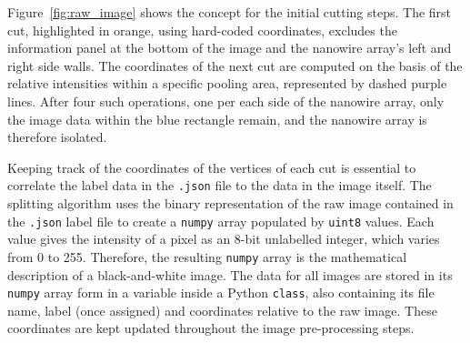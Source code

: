 Figure~\ref{fig:raw_image} shows the concept for the initial cutting steps. The first cut, highlighted in orange, using hard-coded coordinates, excludes the information panel at the bottom of the image and the nanowire array's left and right side walls. The coordinates of the next cut are computed on the basis of the relative intensities within a specific pooling area, represented by dashed purple lines. After four such operations, one per each side of the nanowire array, only the image data within the blue rectangle remain, and the nanowire array is therefore isolated.

Keeping track of the coordinates of the vertices of each cut is essential to correlate the label data in the \texttt{.json} file to the data in the image itself. The splitting algorithm uses the binary representation of the raw image contained in the \texttt{.json} label file to create a \texttt{numpy} \cite{Harris2020, numpy} array populated by \texttt{uint8} values. Each value gives the intensity of a pixel as an 8-bit unlabelled integer, which varies from \num{0} to \num{255}. Therefore, the resulting \texttt{numpy} array is the mathematical description of a black-and-white image. The data for all images are stored in its \texttt{numpy} array form in a variable inside a Python \texttt{class}, also containing its file name, label (once assigned) and coordinates relative to the raw image. These coordinates are kept updated throughout the image pre-processing steps.

